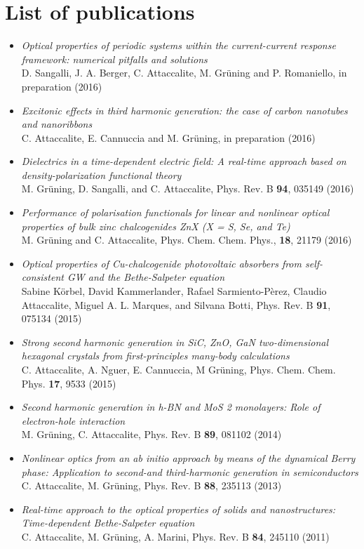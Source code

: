 \chapter{List of publications}
\begin{itemize}
    \item \emph{Optical properties of periodic systems within the current-current response framework: numerical pitfalls and solutions}\\
        D. Sangalli, J. A. Berger, C. Attaccalite, M. Gr\"uning and P. Romaniello, in preparation (2016) 
    \item \emph{Excitonic effects in third harmonic generation: the case of carbon nanotubes and nanoribbons}\\
        C. Attaccalite, E. Cannuccia and M. Gr\"uning, in preparation (2016) 
    \item \emph{Dielectrics in a time-dependent electric field: A real-time approach based on density-polarization functional theory}\\ M. Gr\"uning, D. Sangalli, and C. Attaccalite, Phys. Rev. B \textbf{94}, 035149 (2016)
    \item \emph{Performance of polarisation functionals for linear and nonlinear optical properties of bulk zinc chalcogenides ZnX (X = S, Se, and Te)}\\
        M. Gr\"uning and   C. Attaccalite, Phys. Chem. Chem. Phys., \textbf{18}, 21179 (2016) 
    \item \emph{Optical properties of Cu-chalcogenide photovoltaic absorbers from self-consistent GW and the Bethe-Salpeter equation} \\
        Sabine K\"orbel, David Kammerlander, Rafael Sarmiento-P\`erez, Claudio Attaccalite, Miguel A. L. Marques, and Silvana Botti, Phys. Rev. B \textbf{91}, 075134 (2015)
    \item \emph{Strong second harmonic generation in SiC, ZnO, GaN two-dimensional hexagonal crystals from first-principles many-body calculations} \\
        C. Attaccalite, A. Nguer, E. Cannuccia, M Gr\"uning, Phys. Chem. Chem. Phys. \textbf{17}, 9533 (2015)
    \item \emph{Second harmonic generation in h-BN and MoS 2 monolayers: Role of electron-hole interaction}\\ M. Gr\"uning, C. Attaccalite, Phys. Rev. B \textbf{89}, 081102 (2014)
    \item \emph{Nonlinear optics from an ab initio approach by means of the dynamical Berry phase: Application to second-and third-harmonic generation in semiconductors}\\ C. Attaccalite, M. Gr\"uning, Phys. Rev. B \textbf{88}, 235113 (2013)
    \item  \emph{Real-time approach to the optical properties of solids and nanostructures: Time-dependent Bethe-Salpeter equation}\\ C. Attaccalite, M. Gr\"uning, A. Marini, Phys. Rev. B \textbf{84}, 245110 (2011)
\end{itemize}
